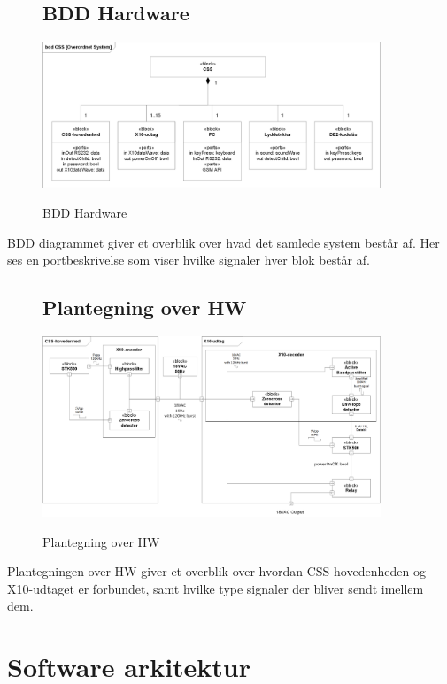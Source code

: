 \begin{figure}[!htbp] \centering
\subsection{BDD Hardware}
{\includegraphics[width=0.9\textwidth]{billeder/diagrammer/BDD_Hardware}}
\caption{BDD Hardware}
\label{lab:bddhardware}
\raggedright
\end{figure}
BDD diagrammet giver et overblik over hvad det samlede system består af. Her ses en portbeskrivelse som viser hvilke signaler hver blok består af.


\begin{figure}[!htbp] \centering
\subsection{Plantegning over HW}
{\includegraphics[width=0.9\textwidth]{billeder/diagrammer/Plantegning_over_HW}}
\caption{Plantegning over HW}
\label{lab:Plantegning over HW}
\raggedright
\end{figure}
Plantegningen over HW giver et overblik over hvordan CSS-hovedenheden og X10-udtaget er forbundet, samt hvilke type signaler der bliver sendt imellem dem.

\clearpage

\section{Software arkitektur}
